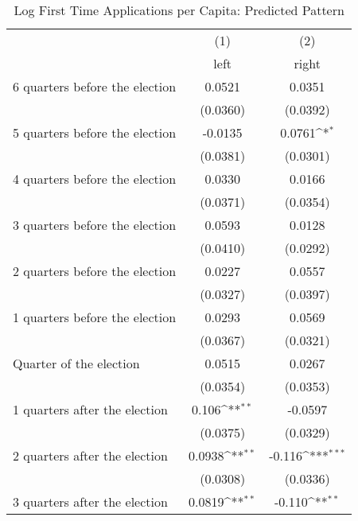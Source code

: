 \begin{table}[htbp]\centering
\def\sym#1{\ifmmode^{#1}\else\(^{#1}\)\fi}
\caption{Log First Time Applications per Capita: Predicted Pattern}
\begin{tabular}{l*{2}{c}}
\hline\hline
                    &\multicolumn{1}{c}{(1)}&\multicolumn{1}{c}{(2)}\\
                    &\multicolumn{1}{c}{left}&\multicolumn{1}{c}{right}\\
\hline
 6 quarters before the election&      0.0521         &      0.0351         \\
                    &    (0.0360)         &    (0.0392)         \\
[1em]
 5 quarters before the election&     -0.0135         &      0.0761\sym{*}  \\
                    &    (0.0381)         &    (0.0301)         \\
[1em]
 4 quarters before the election&      0.0330         &      0.0166         \\
                    &    (0.0371)         &    (0.0354)         \\
[1em]
 3 quarters before the election&      0.0593         &      0.0128         \\
                    &    (0.0410)         &    (0.0292)         \\
[1em]
 2 quarters before the election&      0.0227         &      0.0557         \\
                    &    (0.0327)         &    (0.0397)         \\
[1em]
 1 quarters before the election&      0.0293         &      0.0569         \\
                    &    (0.0367)         &    (0.0321)         \\
[1em]
Quarter of the election&      0.0515         &      0.0267         \\
                    &    (0.0354)         &    (0.0353)         \\
[1em]
 1 quarters after the election&       0.106\sym{**} &     -0.0597         \\
                    &    (0.0375)         &    (0.0329)         \\
[1em]
 2 quarters after the election&      0.0938\sym{**} &      -0.116\sym{***}\\
                    &    (0.0308)         &    (0.0336)         \\
[1em]
 3 quarters after the election&      0.0819\sym{**} &      -0.110\sym{**} \\

\end{tabular}
\end{table}
